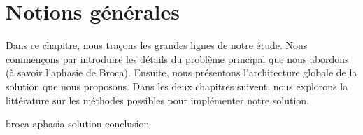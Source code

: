 \chapter{Notions générales}

Dans ce chapitre, nous traçons les grandes lignes de notre étude.
Nous commençons par introduire les détails du problème principal que nous abordons 
(à savoir l'aphasie de Broca).
Ensuite, nous présentons l'architecture globale de la solution que nous proposons.
Dans les deux chapitres suivent, 
nous explorons la littérature sur les méthodes possibles pour implémenter notre solution.

{broca-aphasia}
{solution}
\pagebreak
{conclusion}